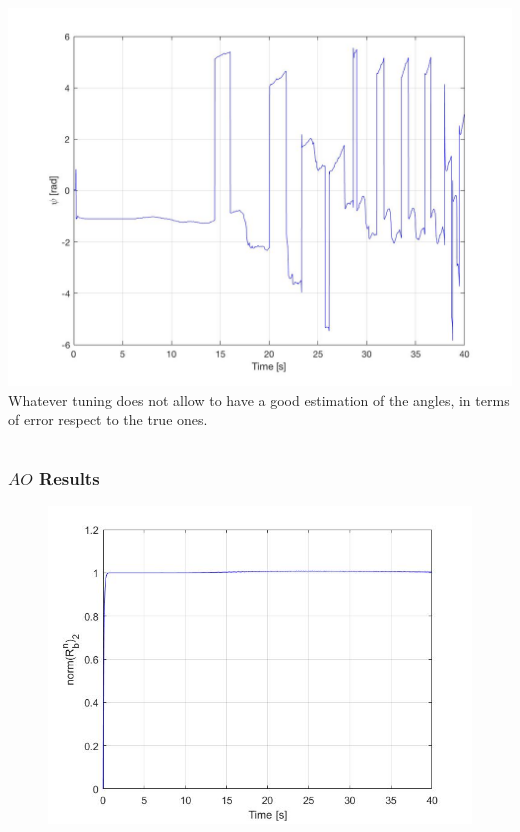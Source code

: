 \documentclass{beamer}
\begin{document}
\begin{frame}
\begin{columns}[t]
			\centering
			\includegraphics[scale= 0.12]{psi_angle.jpg}\\
			\vspace{0.4cm}
			Whatever tuning does not allow to have a good estimation of the angles, in terms of error respect to the true ones.
		\end{columns}
	\end{frame}
	

	\begin{frame}
		\frametitle{$AO$ Results}
		
		\begin{figure}[H]
			\includegraphics[scale=0.4]{norm_rot}
		\end{figure}
		
	\end{frame}
\end{document}

